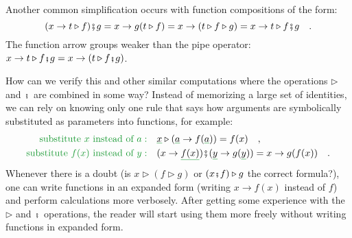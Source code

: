 Another common simplification occurs with function compositions of
the form:
\[
(x\rightarrow t\triangleright f)\bef g=x\rightarrow g(t\triangleright f)=x\rightarrow(t\triangleright f\triangleright g)=x\rightarrow t\triangleright f\bef g\quad.
\]
The function arrow groups weaker than the pipe operator: $x\rightarrow t\triangleright f\bef g=x\rightarrow(t\triangleright f\bef g)$.

How can we verify this and other similar computations where the operations
$\triangleright$ and $\bef$ are combined in some way? Instead of
memorizing a large set of identities, we can rely on knowing only
one rule that says how arguments are symbolically substituted as parameters
into functions, for example:
\begin{align*}
{\color{greenunder}\text{substitute }x\text{ instead of }a:}\quad & \gunderline x\triangleright(\gunderline a\rightarrow f(\gunderline a))=f(x)\quad,\\
{\color{greenunder}\text{substitute }f(x)\text{ instead of }y:}\quad & (x\rightarrow\gunderline{f(x)})\bef(\gunderline y\rightarrow g(\gunderline y))=x\rightarrow g(f(x))\quad.
\end{align*}
Whenever there is a doubt (is $x\triangleright(f\triangleright g)$
or $(x\bef f)\triangleright g$ the correct formula?), one can write
functions in an expanded form (writing $x\rightarrow f(x)$ instead
of $f$) and perform calculations more verbosely. After getting some
experience with the $\triangleright$ and $\bef$ operations, the
reader will start using them more freely without writing functions
in expanded form.

